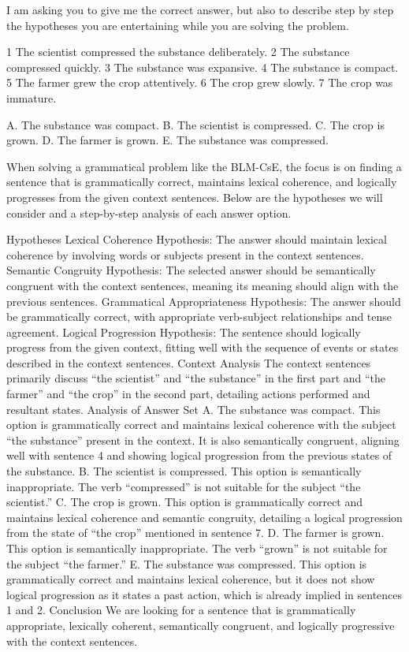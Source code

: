 I am asking you to give me the correct answer, but also to describe step by step  the hypotheses you are entertaining while you are solving the problem. 


1 The scientist compressed the substance deliberately.
2 The substance compressed quickly.
3 The substance was expansive.
4 The substance is compact.
5 The farmer grew the crop attentively.
6 The crop grew slowly.
7 The crop was immature.

A. The substance was compact.
B. The scientist is compressed.
C. The crop is grown.
D. The farmer is grown.
E. The substance was compressed.

When solving a grammatical problem like the BLM-CsE, the focus is on finding a sentence that is grammatically correct, maintains lexical coherence, and logically progresses from the given context sentences. Below are the hypotheses we will consider and a step-by-step analysis of each answer option.

Hypotheses
Lexical Coherence Hypothesis: The answer should maintain lexical coherence by involving words or subjects present in the context sentences.
Semantic Congruity Hypothesis: The selected answer should be semantically congruent with the context sentences, meaning its meaning should align with the previous sentences.
Grammatical Appropriateness Hypothesis: The answer should be grammatically correct, with appropriate verb-subject relationships and tense agreement.
Logical Progression Hypothesis: The sentence should logically progress from the given context, fitting well with the sequence of events or states described in the context sentences.
Context Analysis
The context sentences primarily discuss “the scientist” and “the substance” in the first part and “the farmer” and “the crop” in the second part, detailing actions performed and resultant states.
Analysis of Answer Set
A. The substance was compact.
This option is grammatically correct and maintains lexical coherence with the subject “the substance” present in the context. It is also semantically congruent, aligning well with sentence 4 and showing logical progression from the previous states of the substance.
B. The scientist is compressed.
This option is semantically inappropriate. The verb “compressed” is not suitable for the subject “the scientist.”
C. The crop is grown.
This option is grammatically correct and maintains lexical coherence and semantic congruity, detailing a logical progression from the state of “the crop” mentioned in sentence 7.
D. The farmer is grown.
This option is semantically inappropriate. The verb “grown” is not suitable for the subject “the farmer.”
E. The substance was compressed.
This option is grammatically correct and maintains lexical coherence, but it does not show logical progression as it states a past action, which is already implied in sentences 1 and 2.
Conclusion
We are looking for a sentence that is grammatically appropriate, lexically coherent, semantically congruent, and logically progressive with the context sentences.

